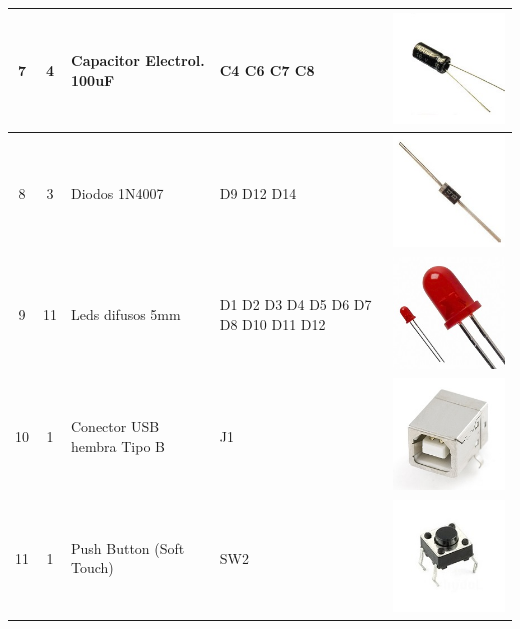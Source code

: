 \begin{tabular}{|c|c|l|p{5cm}|c|}
	      7       &         4         & Capacitor Electrol. 100uF    & C4 C6 C7 C8                         &    \includegraphics[width=0.05\linewidth]{Componentes/capacitor-100uf}     \\[0.5cm] \hline
	      8       &         3         & Diodos 1N4007                & D9 D12 D14                          &      \includegraphics[width=0.05\linewidth]{Componentes/diodo-1n4007}      \\[0.5cm] \hline
	      9       &        11         & Leds difusos 5mm             & D1 D2 D3 D4 D5 D6 D7 D8 D10 D11 D12 &    \includegraphics[width=0.05\linewidth]{Componentes/led-difusos-5mm}     \\[0.5cm] \hline
	     10       &         1         & Conector USB hembra Tipo B   & J1                                  &     \includegraphics[width=0.05\linewidth]{Componentes/conector-usb-b}     \\[0.4cm] \hline
	     11       &         1         & Push Button (Soft Touch)     & SW2                                 &       \includegraphics[width=0.05\linewidth]{Componentes/pushbutton}       \\[0.4cm] \hline
\end{tabular} 

\newpage

